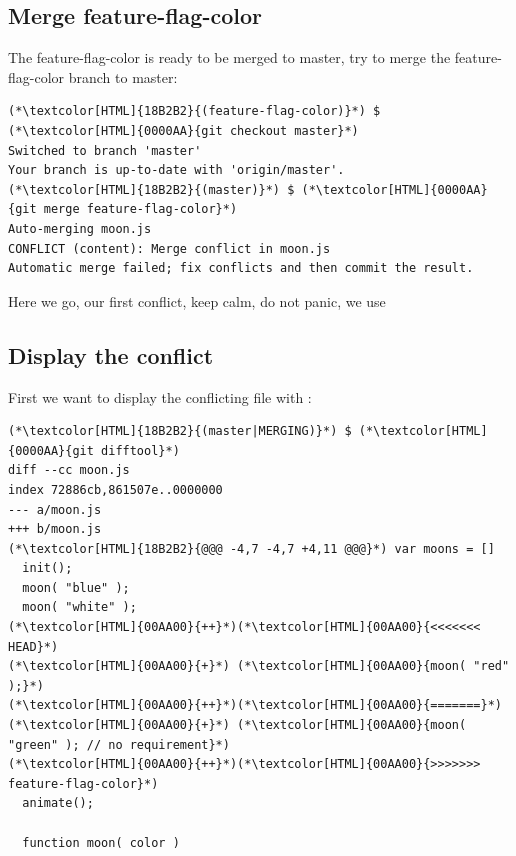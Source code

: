 \subsection{Merge feature-flag-color}
\begin{frame}[fragile]
    \subslidetitle

  The feature-flag-color is ready to be merged to master, try to merge the feature-flag-color branch to master:
  \begin{lstlisting}
(*\textcolor[HTML]{18B2B2}{(feature-flag-color)}*) $ (*\textcolor[HTML]{0000AA}{git checkout master}*)
Switched to branch 'master'
Your branch is up-to-date with 'origin/master'.
(*\textcolor[HTML]{18B2B2}{(master)}*) $ (*\textcolor[HTML]{0000AA}{git merge feature-flag-color}*)
Auto-merging moon.js
CONFLICT (content): Merge conflict in moon.js
Automatic merge failed; fix conflicts and then commit the result.
\end{lstlisting}

Here we go, our first conflict, keep calm, do not panic, we use 
\end{frame}

\subsection{Display the conflict}
\begin{frame}[fragile]
    \subslidetitle

  First we want to display the conflicting file with :
  \begin{lstlisting}
(*\textcolor[HTML]{18B2B2}{(master|MERGING)}*) $ (*\textcolor[HTML]{0000AA}{git difftool}*)
diff --cc moon.js
index 72886cb,861507e..0000000
--- a/moon.js
+++ b/moon.js
(*\textcolor[HTML]{18B2B2}{@@@ -4,7 -4,7 +4,11 @@@}*) var moons = []
  init();
  moon( "blue" );
  moon( "white" );
(*\textcolor[HTML]{00AA00}{++}*)(*\textcolor[HTML]{00AA00}{<<<<<<< HEAD}*)
(*\textcolor[HTML]{00AA00}{+}*) (*\textcolor[HTML]{00AA00}{moon( "red" );}*)
(*\textcolor[HTML]{00AA00}{++}*)(*\textcolor[HTML]{00AA00}{=======}*)
(*\textcolor[HTML]{00AA00}{+}*) (*\textcolor[HTML]{00AA00}{moon( "green" ); // no requirement}*)
(*\textcolor[HTML]{00AA00}{++}*)(*\textcolor[HTML]{00AA00}{>>>>>>> feature-flag-color}*)
  animate();
  
  function moon( color )
\end{lstlisting}
\end{frame}

